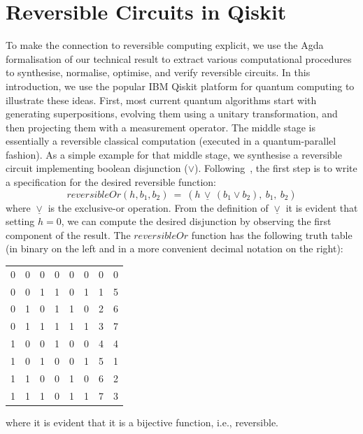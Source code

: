 \section{Reversible Circuits in Qiskit}
\label{sec:qiskit}

To make the connection to reversible computing explicit, we use the Agda
formalisation of our technical result to extract various computational
procedures to synthesise, normalise, optimise, and verify reversible
circuits. In this introduction, we use the popular IBM Qiskit platform for
quantum computing to illustrate these ideas. First, most current quantum
algorithms start with generating superpositions, evolving them using a unitary
transformation, and then projecting them with a measurement operator. The middle
stage is essentially a reversible classical computation (executed in a
quantum-parallel fashion). As a simple example for that middle stage, we
synthesise a reversible circuit implementing boolean disjunction
($\vee$). Following~\citet{Toffoli:1980}, the first step is to write a
specification for the desired reversible function:
\[
\mathit{reversibleOr}(h,b_1,b_2) ~=~ (h \,\underline{\vee}\, (b_1 \vee b_2), ~b_1, ~b_2)
\]
where $\underline{\vee}$ is the exclusive-or operation. From the definition of $\underline{\vee}$ it is evident that setting $h=0$, we can compute the desired disjunction by observing the first component of the result. The $\mathit{reversibleOr}$ function has the following truth table (in binary on the left and in a more convenient decimal notation on the right):

\begin{center}\begin{tabular}{|ccc|ccc|@{\qquad\qquad}|c|c|}
0 & 0 & 0 &     0 & 0 & 0     & 0 & 0 \\
0 & 0 & 1 &     1 & 0 & 1     & 1 & 5 \\
0 & 1 & 0 &     1 & 1 & 0    & 2 & 6 \\
0 & 1 & 1 &     1 & 1 & 1    & 3 & 7 \\
1 & 0 & 0 &     1 & 0 & 0    & 4 & 4 \\
1 & 0 & 1 &     0 & 0 & 1    & 5 & 1 \\
1 & 1 & 0 &     0 & 1 & 0    & 6 & 2 \\
1 & 1 & 1 &     0 & 1 & 1    & 7 & 3
\end{tabular}\end{center}

\noindent where it is evident that it is a bijective function, i.e., reversible.

